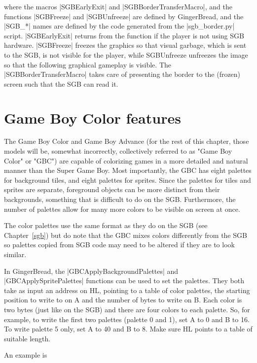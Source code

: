 \documentclass[11pt]{book}
\begin{document}
where the macros |SGBEarlyExit| and |SGBBorderTransferMacro|, and the functions |SGBFreeze| and |SGBUnfreeze| are defined by GingerBread, and the |SGB_*| names are defined by the code generated from the |sgb_border.py| script. |SGBEarlyExit| returns from the function if the player is not using SGB hardware. |SGBFreeze| freezes the graphics so that visual garbage, which is sent to the SGB, is not visible for the player, while SGBUnfreeze unfreezes the image so that the following graphical gameplay is visible. The |SGBBorderTransferMacro| takes care of presenting the border to the (frozen) screen such that the SGB can read it.
 
\chapter{Game Boy Color features}
\label{gbc}
The Game Boy Color and Game Boy Advance (for the rest of this chapter, those models will be, somewhat incorrectly, collectively referred to as "Game Boy Color" or "GBC") are capable of colorizing games in a more detailed and natural manner than the Super Game Boy. Most importantly, the GBC has eight palettes for background tiles, and eight palettes for sprites. Since the palettes for tiles and sprites are separate, foreground objects can be more distinct from their backgrounds, something that is difficult to do on the SGB. Furthermore, the number of palettes allow for many more colors to be visible on screen at once.

The color palettes use the same format as they do on the SGB (see Chapter~\ref{sgb}) but do note that the GBC mixes colors differently from the SGB so palettes copied from SGB code may need to be altered if they are to look similar.

In GingerBread, the |GBCApplyBackgroundPalettes| and |GBCApplySpritePalettes| functions can be used to set the palettes. They both take as input an address on HL, pointing to a table of color palettes, the starting position to write to on A and the number of bytes to write on B. Each color is two bytes (just like on the SGB) and there are four colors to each palette. So, for example, to write the first two palettes (palette 0 and 1), set A to 0 and B to 16. To write palette 5 only, set A to 40 and B to 8. Make sure HL points to a table of suitable length.

An example is 
\end{document}

